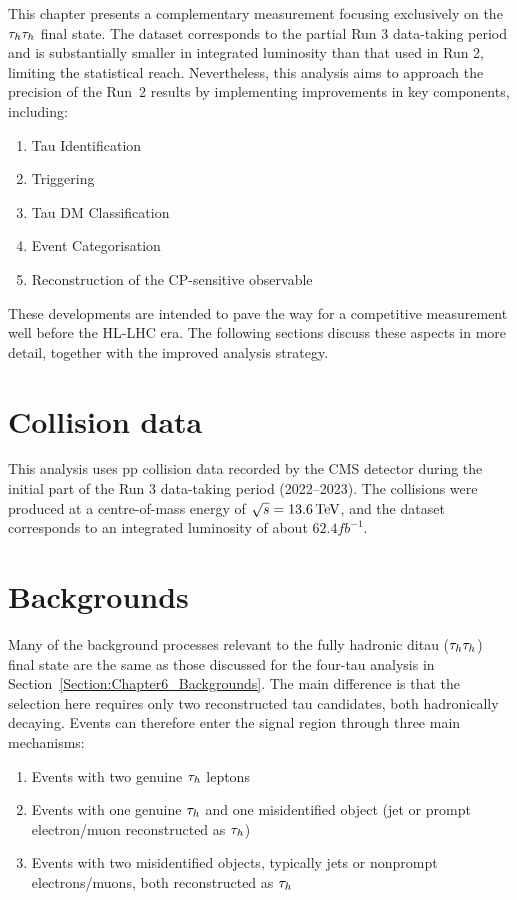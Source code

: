 This chapter presents a complementary measurement focusing exclusively on the $\tau_h \tau_h$ final state. The dataset corresponds to the partial Run 3 data-taking period and is substantially smaller in integrated luminosity than that used in Run 2, limiting the statistical reach. Nevertheless, this analysis aims to approach the precision of the Run~2 results by implementing improvements in key components, including:

\begin{enumerate}[label=(\roman*)]
    \item Tau Identification
    \item Triggering
    \item Tau \ac{DM} Classification
    \item Event Categorisation
    \item Reconstruction of the CP-sensitive observable
\end{enumerate}

These developments are intended to pave the way for a competitive measurement well before the \ac{HL}-\ac{LHC} era. The following sections discuss these aspects in more detail, together with the improved analysis strategy.


\section{Collision data}

This analysis uses pp collision data recorded by the \ac{CMS} detector during the initial part of the Run 3 data-taking period (2022–2023). The collisions were produced at a centre-of-mass energy of $\sqrt{s} = 13.6\,\text{Te\hspace{-.08em}V}$, and the dataset corresponds to an integrated luminosity of about $62.4\unit{fb}^{-1}$.

\section{Backgrounds}
\label{Section:Chapter7_Backgrounds}

Many of the background processes relevant to the fully hadronic ditau ($\tau_h\tau_h$) final state are the same as those discussed for the four-tau analysis in Section~\ref{Section:Chapter6_Backgrounds}. The main difference is that the selection here requires only two reconstructed tau candidates, both hadronically decaying. Events can therefore enter the signal region through three main mechanisms:  
\begin{enumerate}[label=(\roman*)]
    \item Events with two genuine $\tau_h$ leptons  
    \item Events with one genuine $\tau_h$ and one misidentified object (jet or prompt electron/muon reconstructed as $\tau_h$)  
    \item Events with two misidentified objects, typically jets or nonprompt electrons/muons, both reconstructed as $\tau_h$
\end{enumerate}

